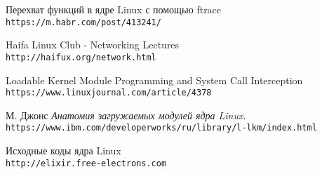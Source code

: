 %



\begin{thebibliography}{9}
	Перехват функций в ядре Linux с помощью ftrace
	\\\texttt{https://m.habr.com/post/413241/}
	
	Haifa Linux Club - Networking Lectures
	\\\texttt{http://haifux.org/network.html}
	
	Loadable Kernel Module Programming and System Call Interception
	\\\texttt{https://www.linuxjournal.com/article/4378}
	
	М. Джонс 
	\textit{Анатомия загружаемых модулей ядра Linux}.
	\\\texttt{https://www.ibm.com/developerworks/ru/library/l-lkm/index.html}
	
	Исходные коды ядра Linux
	\\\texttt{http://elixir.free-electrons.com}
\end{thebibliography}


